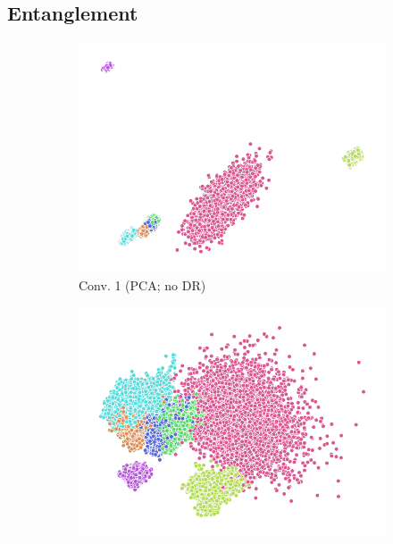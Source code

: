 \hypertarget{entanglement-1}{%
\subsection{Entanglement}\label{entanglement-1}}

\label{sec:activation_analysis}

\begin{figure}
  \centering
  \begin{subfigure}{0.22\textwidth}
    \includegraphics[width=\textwidth]{figures/chapter6/embeddings/jaco_no-DR_prop_conv1_PCA.png}
    \caption{Conv. 1 (PCA; no DR)}
  \end{subfigure}
  \begin{subfigure}{0.22\textwidth}
    \includegraphics[width=\textwidth]{figures/chapter6/embeddings/jaco_no-DR_prop_conv2_PCA.png}

\end{subfigure}
\end{figure}

